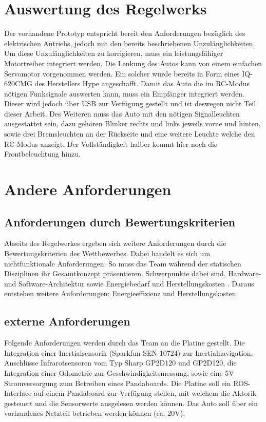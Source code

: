 \section{Auswertung des Regelwerks}
Der vorhandene Prototyp entspricht bereit den Anforderungen bezüglich des elektrischen Antriebs, jedoch mit den bereits beschriebenen Unzulänglichkeiten. 
Um diese Unzulänglichkeiten zu korrigieren, muss ein leistungsfähiger Motortreiber integriert werden.
Die Lenkung des Autos kann von einem einfachen Servomotor vorgenommen werden. Ein solcher wurde bereits in Form eines IQ-620CMG des Herstellers Hype angeschafft. 
Damit das Auto die im RC-Modus nötigen Funksignale auswerten kann, muss ein Empfänger integriert werden. Dieser wird jedoch über USB zur Verfügung gestellt
und ist deswegen nicht Teil dieser Arbeit. Des Weiteren muss das Auto mit den nötigen Signalleuchten ausgestattet sein, dazu gehören Blinker rechts und links
jeweils vorne und hinten, sowie drei Bremsleuchten an der Rückseite und eine weitere Leuchte welche den RC-Modus anzeigt. Der Vollständigkeit halber kommt hier noch die
Frontbeleuchtung hinzu.

\section{Andere Anforderungen}
\subsection{Anforderungen durch Bewertungskriterien}
Abseits des Regelwerkes ergeben sich weitere Anforderungen durch die Bewertungskriterien des Wettbewerbes. Dabei handelt es sich um nichtfunktionale Anforderungen.
So muss das Team während der statischen Disziplinen ihr Gesamtkonzept präsentieren. Schwerpunkte dabei sind, Hardware- und Software-Architektur sowie Energiebedarf und 
Herstellungskosten \cite{website-carolo-cup-regelwerk}. Daraus entstehen weitere Anforderungen: Energieeffizienz und Herstellungskosten. \\


\subsection{externe Anforderungen}
Folgende Anforderungen werden durch das Team an die Platine gestellt. Die Integration einer Inertialsensorik (Sparkfun SEN-10724) zur Inertialnavigation,
Anschlüsse Infrarotsensoren vom Typ Sharp GP2D120 und GP2D120, die Integration einer Odometrie zur Geschwindigkeitsmessung,
sowie eine 5V Stromversorgung zum Betreiben eines Pandaboards. Die Platine soll ein ROS-Interface auf einem Pandaboard zur Verfügung stellen, mit welchem die Aktorik gesteuert und
die Sensorwerte ausgelesen werden können. Das Auto soll über ein vorhandenes Netzteil betrieben werden können (ca. 20V).\\

